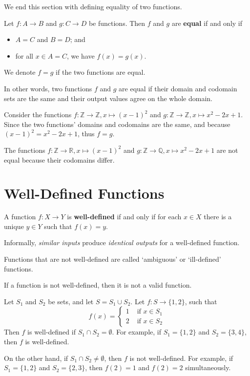 We end this section with defining equality of two functions.
\begin{definition}
    Let $f: A \to B$ and $g: C \to D$ be functions. Then $f$ and $g$ are \textbf{equal} if and only if
    \begin{itemize}
        \item $A = C$ and $B = D$; and
        \item for all $x \in A = C$, we have $f(x) = g(x)$.
    \end{itemize}
    We denote $f = g$ if the two functions are equal.
\end{definition}
In other words, two functions $f$ and $g$ are equal if their domain and codomain sets are the same and their output values agree on the whole domain.
\begin{example}
    Consider the functions $f: \mathbb{Z} \to \mathbb{Z}, x \mapsto (x-1)^2$ and $g: \mathbb{Z} \to \mathbb{Z}, x \mapsto x^2 - 2x + 1$. Since the two functions' domains and codomains are the same, and because $(x-1)^2 = x^2 - 2x + 1$, thus $f = g$.
\end{example}
\begin{example}
    The functions $f: \mathbb{Z} \to \mathbb{R}, x \mapsto (x-1)^2$ and $g: \mathbb{Z} \to \mathbb{Q}, x \mapsto x^2 - 2x + 1$ are not equal because their codomains differ.
\end{example}

\section{Well-Defined Functions}
\begin{definition}
    A function $f: X \to Y$ is \textbf{well-defined} if and only if for each $x \in X$ there is a unique $y \in Y$ such that $f(x) = y$.
\end{definition}
Informally, \textit{similar inputs} produce \textit{identical outputs} for a well-defined function.
\begin{remark}
    Functions that are not well-defined are called `ambiguous' or `ill-defined' functions.
\end{remark}
\begin{remark}
    If a function is not well-defined, then it is not a valid function.
\end{remark}

\begin{example}
    Let $S_1$ and $S_2$ be sets, and let $S = S_1 \cup S_2$. Let $f: S \to \{1, 2\}$, such that
    \[
        f(x) = \begin{cases}
            1 & \textrm{ if } x \in S_1\\
            2 & \textrm{ if } x \in S_2
        \end{cases}
    \]
    Then $f$ is well-defined if $S_1 \cap S_2 = \emptyset$. For example, if $S_1 = \{1, 2\}$ and $S_2 = \{3, 4\}$, then $f$ is well-defined.
    
    On the other hand, if $S_1 \cap S_2 \neq \emptyset$, then $f$ is not well-defined. For example, if $S_1 = \{1, 2\}$ and $S_2 = \{2, 3\}$, then $f(2) = 1$ and $f(2) = 2$ simultaneously.
\end{example}

